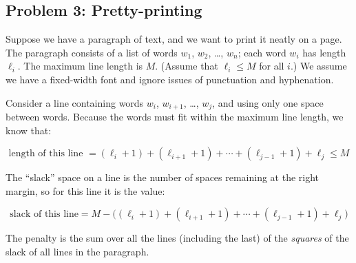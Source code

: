 \documentclass[11pt]{article}
\begin{document}





\subsection* {Problem 3: Pretty-printing}

Suppose we have a paragraph of text, and we want to print it neatly on a page.
The paragraph consists of a list of words $w_1$, $w_2$, \ldots, $w_n$;
each word $w_i$ has length $\ell_i$.
The maximum line length is $M$.
(Assume that $\ell_i \leq M$ for all $i$.)
We assume we have a fixed-width font and ignore issues of punctuation and hyphenation. 

Consider a line containing words $w_i$, $w_{i+1}$, \ldots, $w_j$, and using only one space between words.
Because the words must fit within the maximum line length, we know that:

\[\text{length of this line } = (\ell_i+1)  + (\ell_{i+1}+1) + \cdots + (\ell_{j-1} +1) + \ell_j \leq M \]

The ``slack'' space on a line is the number of spaces remaining at the right margin, so for this line it is the value:

\[\text{slack of this line} =  M - \bigg( (\ell_i+1) + (\ell_{i+1}+1) + \cdots + (\ell_{j-1} +1) + \ell_j \bigg) \]

The penalty is the sum over all the lines (including the last) of the \emph{squares} of the slack of all lines in the paragraph.
\end{document}

